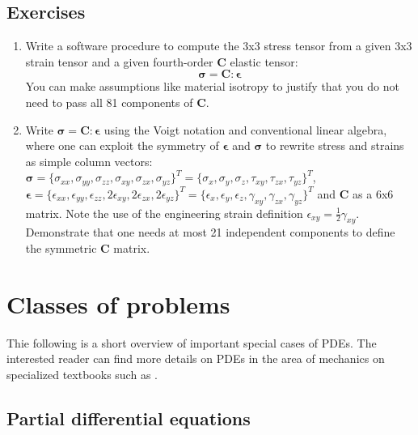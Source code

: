 \documentclass{digitaldynamics}
\def\tensor#1{\bm{#1}}
\begin{document}
\subsection{Exercises}

{
\small

\begin{enumerate}
	
	\item Write a software procedure to compute the 3x3 stress tensor from a given 3x3 strain tensor and a given fourth-order $\tensor{C}$ elastic tensor:
	\[
	\tensor{\sigma} = \tensor{C} : \tensor{\epsilon}
	\]
	You can make assumptions like material isotropy to justify that you do not need to pass all 81 components of $\tensor{C}$.
	
	\item Write $\tensor{\sigma} = \tensor{C} : \tensor{\epsilon}$ using the Voigt notation and conventional linear algebra, where one can exploit the symmetry of $\tensor{\epsilon}$ and $\tensor{\sigma}$ to rewrite stress and strains as simple column vectors:
	$\tensor{\sigma} = \{ \sigma_{xx}, \sigma_{yy}, \sigma_{zz}, \sigma_{xy}, \sigma_{zx}, \sigma_{yz} \}^T 
	                  = \{ \sigma_x, \sigma_y, \sigma_z, \tau_{xy}, \tau_{zx}, \tau_{yz} \}^T$,
	$\tensor{\epsilon} = \{ \epsilon_{xx}, \epsilon_{yy}, \epsilon_{zz}, 2\epsilon_{xy}, 2\epsilon_{zx}, 2\epsilon_{yz} \}^T  
	                   = \{ \epsilon_x, \epsilon_y, \epsilon_z, \gamma_{xy}, \gamma_{zx}, \gamma_{yz} \}^T $ 
	and $\tensor{C}$ as a 6x6 matrix.
	Note the use of the engineering strain definition $\epsilon_{xy} = \frac{1}{2}\gamma_{xy}$.
	Demonstrate that one needs at most 21 independent components to define the symmetric $\tensor{C}$ matrix.
	
	
\end{enumerate}

}



\newpage
\section{Classes of problems}

Thie following is a short overview of important special cases of PDEs. 
The interested reader can find more details on PDEs in the area of mechanics on specialized textbooks such as \cite{cosserat1909,Truesdell2004}.


\subsection{Partial differential equations}
\end{document}
